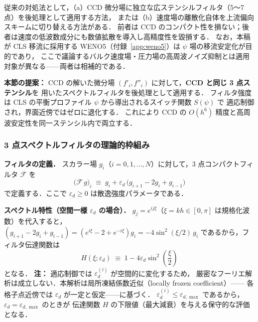 従来の対処法として，（a）CCD 微分場に独立な広ステンシルフィルタ（5〜7 点）を後処理として適用する方法，
または（b）速度場の離散化自体を上流偏向スキームに切り替える方法がある．
前者は CCD のコンパクト性を損ない；後者は速度の低波数成分にも数値拡散を導入し高精度性を毀損する．
なお，本稿が CLS 移流に採用する WENO5（付録~\ref{app:weno5}）は $\psi$ 場の移流安定化が目的であり，
ここで議論するバルク速度場・圧力場の高周波ノイズ抑制とは適用対象が異なる——両者は相補的である．

\textbf{本節の提案：}
CCD の解いた微分場 $(f'_i, f''_i)$ に対して，\textbf{CCD と同じ 3 点ステンシル}を
用いたスペクトルフィルタを後処理として適用する．
フィルタ強度は CLS の平衡プロファイル $\psi$ から導出されるスイッチ関数 $S(\psi)$ で
適応制御され，界面近傍ではゼロに退化する．
これにより CCD の $O(h^6)$ 精度と高周波安定性を同一ステンシル内で両立する．

\subsubsection{3 点スペクトルフィルタの理論的枠組み}
\label{sec:dccd_filter_theory}

\textbf{フィルタの定義．}
スカラー場 $g_i$（$i = 0, 1, \ldots, N$）に対して，3 点コンパクトフィルタ $\mathcal{F}$ を
\begin{equation}
  \bigl(\mathcal{F}\,g\bigr)_i
  \;\equiv\;
  g_i + \varepsilon_d\,\bigl(g_{i+1} - 2g_i + g_{i-1}\bigr)
  \label{eq:dccd_filter}
\end{equation}
で定義する．ここで $\varepsilon_d \geq 0$ は散逸強度パラメータである．

\textbf{スペクトル特性（空間一様 $\varepsilon_d$ の場合）．}
$g_j = e^{ij\xi}$（$\xi = kh \in [0,\pi]$ は規格化波数）を代入すると，
$(g_{i+1}-2g_i+g_{i-1}) = (e^{i\xi}-2+e^{-i\xi})g_i = -4\sin^2(\xi/2)\,g_i$
であるから，フィルタ伝達関数は
\begin{equation}
  H(\xi;\varepsilon_d)
  \;\equiv\;
  1 - 4\varepsilon_d\sin^2\!\left(\frac{\xi}{2}\right)
  \label{eq:dccd_transfer}
\end{equation}
となる．
\textbf{注：} 適応制御では $\varepsilon_d^{(i)}$ が空間的に変化するため，
厳密なフーリエ解析は成立しない．本解析は局所凍結係数近似（locally frozen coefficient）——
各格子点近傍では $\varepsilon_d$ が一定と仮定——に基づく．
$\varepsilon_d^{(i)} \leq \varepsilon_{d,\max}$ であるから，$\varepsilon_d = \varepsilon_{d,\max}$ のときが
伝達関数 $H$ の下限値（最大減衰）を与える保守的な評価となる．

